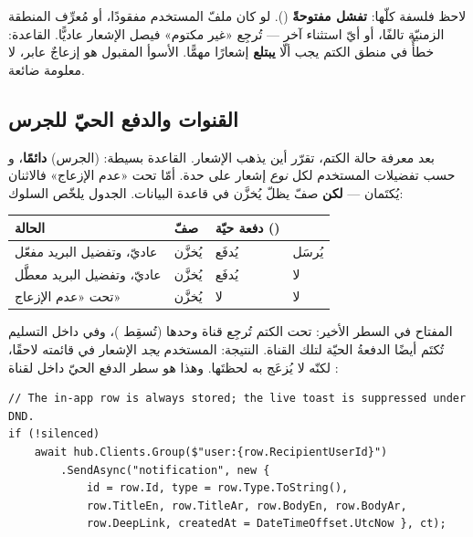 \begin{secnote}
لاحظ فلسفة  كلّها: \textbf{تفشل مفتوحةً} (). لو
كان ملفّ المستخدم مفقودًا، أو مُعرِّف المنطقة الزمنيّة تالفًا، أو أيّ استثناء آخر —
تُرجِع «غير مكتوم» فيصل الإشعار عاديًّا. القاعدة: خطأٌ في منطق الكتم يجب ألّا
\textbf{يبتلع} إشعارًا مهمًّا. الأسوأ المقبول هو إزعاجٌ عابر، لا معلومة ضائعة.
\end{secnote}

\subsection{القنوات والدفع الحيّ للجرس}

بعد معرفة حالة الكتم، تقرّر  أين يذهب الإشعار. القاعدة
بسيطة:  (الجرس) \textbf{دائمًا}، و حسب تفضيلات المستخدم لكل
\emph{نوع} إشعار على حدة. أمّا تحت «عدم الإزعاج» فالاثنان يُكتَمان — \textbf{لكن}
صفّ  يظلّ يُخزَّن في قاعدة البيانات. الجدول يلخّص السلوك:

\begin{center}
\begin{tabular}{L{4.4cm} C{2.4cm} C{2.9cm} C{2.0cm}}
\toprule
\textbf{\color{spPrimary}الحالة} & \textbf{\color{spPrimary}صفّ } & \textbf{\color{spPrimary}دفعة حيّة ()} & \textbf{\color{spPrimary}} \\
\midrule
عاديّ، وتفضيل البريد مفعّل   & يُخزَّن & يُدفَع & يُرسَل \\
عاديّ، وتفضيل البريد معطَّل  & يُخزَّن & يُدفَع & لا \\
تحت «عدم الإزعاج»           & يُخزَّن & لا     & لا \\
\bottomrule
\end{tabular}
\end{center}

المفتاح في السطر الأخير: تحت الكتم تُرجِع  قناة
 وحدها (تُسقِط )، وفي داخل التسليم تُكتَم أيضًا الدفعةُ الحيّة
لتلك القناة. النتيجة: المستخدم \emph{يجد} الإشعار في قائمته لاحقًا، لكنّه لا يُزعَج
به لحظتَها. وهذا هو سطر الدفع الحيّ داخل  لقناة :

\begin{english}
\begin{lstlisting}[language={[Sharp]C}]
// The in-app row is always stored; the live toast is suppressed under DND.
if (!silenced)
    await hub.Clients.Group($"user:{row.RecipientUserId}")
        .SendAsync("notification", new {
            id = row.Id, type = row.Type.ToString(),
            row.TitleEn, row.TitleAr, row.BodyEn, row.BodyAr,
            row.DeepLink, createdAt = DateTimeOffset.UtcNow }, ct);
\end{lstlisting}
\end{english}

